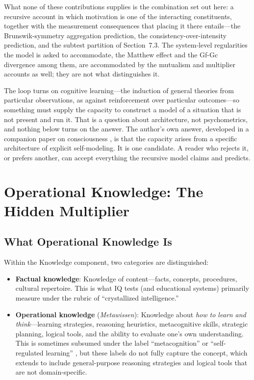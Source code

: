 \documentclass[12pt,a4paper]{article}
\begin{document}
What none of these contributions supplies is the combination set out here: a recursive account in which motivation is one of the interacting constituents, together with the measurement consequences that placing it there entails---\hspace{0pt}the Brunswik-symmetry aggregation prediction, the consistency-over-intensity prediction, and the subtest partition of Section~7.3. The system-level regularities the model is asked to accommodate, the Matthew effect and the Gf-Gc divergence among them, are accommodated by the mutualism and multiplier accounts as well; they are not what distinguishes it.

The loop turns on cognitive learning---\hspace{0pt}the induction of general theories from particular observations, as against reinforcement over particular outcomes---\hspace{0pt}so something must supply the capacity to construct a model of a situation that is not present and run it. That is a question about architecture, not psychometrics, and nothing below turns on the answer. The author's own answer, developed in a companion paper on consciousness \citep{Gruber2026}, is that the capacity arises from a specific architecture of explicit self-modeling. It is one candidate. A reader who rejects it, or prefers another, can accept everything the recursive model claims and predicts.


\section{Operational Knowledge: The Hidden Multiplier}

\subsection{What Operational Knowledge Is}

Within the Knowledge component, two categories are distinguished:

\begin{itemize}
\item \textbf{Factual knowledge}: Knowledge of content---\hspace{0pt}facts, concepts, procedures, cultural repertoire. This is what IQ tests (and educational systems) primarily measure under the rubric of ``crystallized intelligence.''

\item \textbf{Operational knowledge} (\emph{Metawissen}): Knowledge about \emph{how to learn and think}---\hspace{0pt}learning strategies, reasoning heuristics, metacognitive skills, strategic planning, logical tools, and the ability to evaluate one's own understanding. This is sometimes subsumed under the label ``metacognition'' \citep{Flavell1979} or ``self-regulated learning'' \citep{Zimmerman2002}, but these labels do not fully capture the concept, which extends to include general-purpose reasoning strategies and logical tools that are not domain-specific.
\end{itemize}
\end{document}
